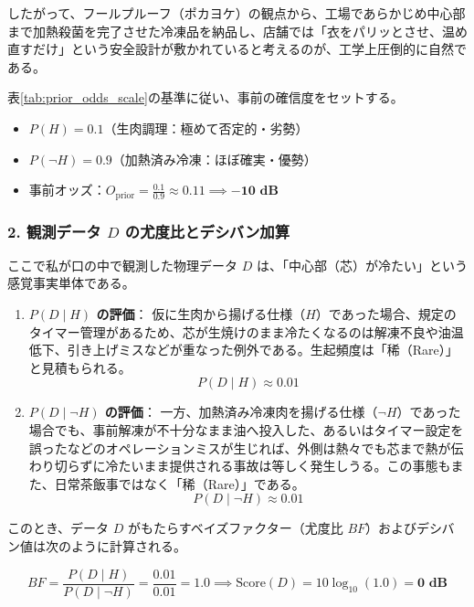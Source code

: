 したがって、フールプルーフ（ポカヨケ）の観点から、工場であらかじめ中心部まで加熱殺菌を完了させた冷凍品を納品し、店舗では「衣をパリッとさせ、温め直すだけ」という安全設計が敷かれていると考えるのが、工学上圧倒的に自然である。

表\ref{tab:prior_odds_scale}の基準に従い、事前の確信度をセットする。
\begin{itemize}
    \item $P(H) = 0.1$（生肉調理：極めて否定的・劣勢）
    \item $P(\neg H) = 0.9$（加熱済み冷凍：ほぼ確実・優勢）
    \item 事前オッズ：$O_{\mathrm{prior}} = \frac{0.1}{0.9} \approx 0.11 \implies \mathbf{-10\text{ dB}}$
\end{itemize}

\subsubsection{2. 観測データ $D$ の尤度比とデシバン加算}

ここで私が口の中で観測した物理データ $D$ は、「中心部（芯）が冷たい」という感覚事実単体である。

\begin{enumerate}
    \item \textbf{$P(D \mid H)$ の評価}：
    仮に生肉から揚げる仕様（$H$）であった場合、規定のタイマー管理があるため、芯が生焼けのまま冷たくなるのは解凍不良や油温低下、引き上げミスなどが重なった例外である。生起頻度は「稀（Rare）」と見積もられる。
    \[
    P(D \mid H) \approx 0.01
    \]
    
    \item \textbf{$P(D \mid \neg H)$ の評価}：
    一方、加熱済み冷凍肉を揚げる仕様（$\neg H$）であった場合でも、事前解凍が不十分なまま油へ投入した、あるいはタイマー設定を誤ったなどのオペレーションミスが生じれば、外側は熱々でも芯まで熱が伝わり切らずに冷たいまま提供される事故は等しく発生しうる。この事態もまた、日常茶飯事ではなく「稀（Rare）」である。
    \[
    P(D \mid \neg H) \approx 0.01
    \]
\end{enumerate}

このとき、データ $D$ がもたらすベイズファクター（尤度比 $BF$）およびデシバン値は次のように計算される。

\begin{equation}
BF = \frac{P(D \mid H)}{P(D \mid \neg H)} = \frac{0.01}{0.01} = 1.0 \implies \text{Score}(D) = 10 \log_{10}(1.0) = \mathbf{0\text{ dB}}
\end{equation}


